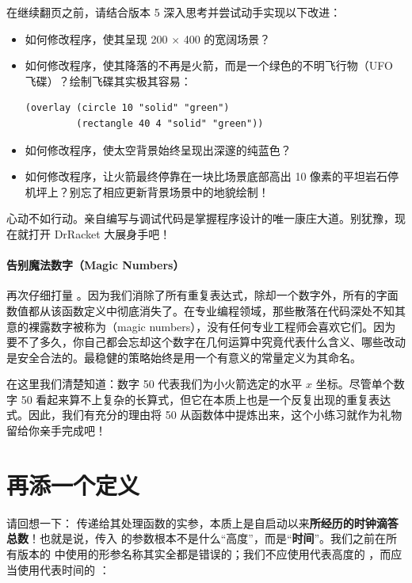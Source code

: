 在继续翻页之前，请结合版本 5 深入思考并尝试动手实现以下改进：
\begin{itemize}
  \item 如何修改程序，使其呈现 200 $\times$ 400 的宽阔场景？
  \item 如何修改程序，使其降落的不再是火箭，而是一个绿色的不明飞行物（UFO 飞碟）？绘制飞碟其实极其容易：
\begin{lstlisting}[language=BSL]
(overlay (circle 10 "solid" "green")
         (rectangle 40 4 "solid" "green"))
\end{lstlisting}
  \item 如何修改程序，使太空背景始终呈现出深邃的纯蓝色？
  \item 如何修改程序，让火箭最终停靠在一块比场景底部高出 10 像素的平坦岩石停机坪上？别忘了相应更新背景场景中的地貌绘制！
\end{itemize}

心动不如行动。亲自编写与调试代码是掌握程序设计的唯一康庄大道。别犹豫，现在就打开 DrRacket 大展身手吧！

\paragraph{告别魔法数字（Magic Numbers）}
再次仔细打量 。因为我们消除了所有重复表达式，除却一个数字外，所有的字面数值都从该函数定义中彻底消失了。在专业编程领域，那些散落在代码深处不知其意的裸露数字被称为（magic numbers），没有任何专业工程师会喜欢它们。因为要不了多久，你自己都会忘却这个数字在几何运算中究竟代表什么含义、哪些改动是安全合法的。最稳健的策略始终是用一个有意义的常量定义为其命名。

在这里我们清楚知道：数字 50 代表我们为小火箭选定的水平 $x$ 坐标。尽管单个数字 50 看起来算不上复杂的长算式，但它在本质上也是一个反复出现的重复表达式。因此，我们有充分的理由将 50 从函数体中提炼出来，这个小练习就作为礼物留给你亲手完成吧！


\section{再添一个定义}
\label{sec:prologue:one_more_definition}

请回想一下： 传递给其处理函数的实参，本质上是自启动以来\textbf{所经历的时钟滴答总数}！也就是说，传入  的参数根本不是什么“高度”，而是“\textbf{时间}”。我们之前在所有版本的  中使用的形参名称其实全都是错误的；我们不应使用代表高度的 ，而应当使用代表时间的 ：

